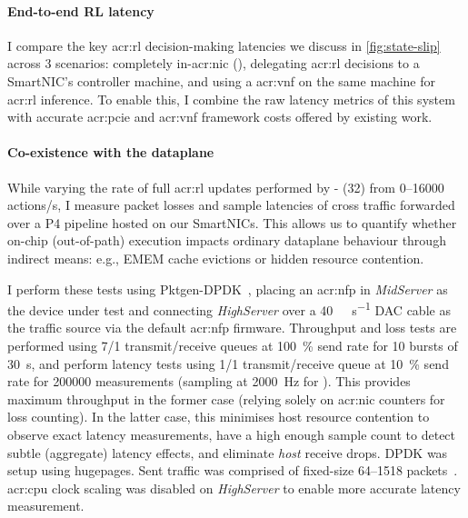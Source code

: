 \paragraph{End-to-end RL latency}
I compare the key \gls{acr:rl} decision-making latencies we discuss in \cref{fig:state-slip} across 3 scenarios: completely in-\gls{acr:nic} (\approachshort{}), delegating \gls{acr:rl} decisions to a SmartNIC's controller machine, and using a \gls{acr:vnf} on the same machine for \gls{acr:rl} inference.
To enable this, I combine the raw latency metrics of this system with accurate \gls{acr:pcie} and \gls{acr:vnf} framework costs offered by existing work.

\paragraph{Co-existence with the dataplane}
While varying the rate of full \gls{acr:rl} updates performed by \approachshort{}-\Coopfw{} (\qty{32}{\bit}) from \numrange{0}{16000} actions/s, I measure packet losses and sample latencies of cross traffic forwarded over a P4 pipeline hosted on our SmartNICs.
This allows us to quantify whether on-chip (out-of-path) execution impacts ordinary dataplane behaviour through indirect means: e.g., EMEM cache evictions or hidden resource contention.

I perform these tests using Pktgen-DPDK~\parencite{pktgen-dpdk}, placing an \gls{acr:nfp} in \emph{MidServer} as the device under test and connecting \emph{HighServer} over a \qty{40}{\giga\bit\per\second} DAC cable as the traffic source via the default \gls{acr:nfp} firmware.
Throughput and loss tests are performed using \num{7}/\num{1} transmit/receive queues at \qty{100}{\percent} send rate for 10 bursts of \qty{30}{\second}, and perform latency tests using \num{1}/\num{1} transmit/receive queue at \qty{10}{\percent} send rate for \num{200000} measurements (sampling at \qty{2000}{\hertz} for ).
This provides maximum throughput in the former case (relying solely on \gls{acr:nic} counters for loss counting).
In the latter case, this minimises host resource contention to observe exact latency measurements, have a high enough sample count to detect subtle (aggregate) latency effects, and eliminate \emph{host} receive drops.
DPDK was setup using  hugepages.
Sent traffic was comprised of fixed-size \qtyrange{64}{1518}{\byte} packets~\parencite{rfc2544}.
\gls{acr:cpu} clock scaling was disabled on \emph{HighServer} to enable more accurate latency measurement.

